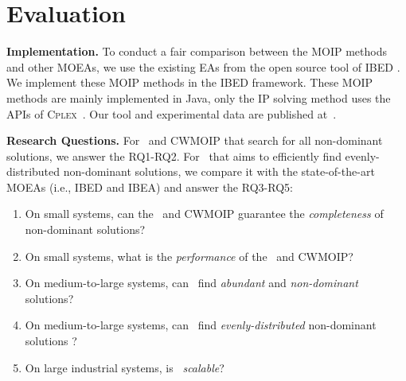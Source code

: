 
\section{Evaluation}\label{sec:application}
\noindent\textbf{Implementation.} To conduct a fair comparison between the MOIP methods and other MOEAs, we use the existing EAs from the open source tool of IBED \cite{DBLP:journals/asc/XueZT0CC016}. We implement these MOIP methods in the \textsc{IBED} framework. These MOIP methods are mainly implemented in Java, only the IP solving method uses the APIs of \textsc{Cplex}~\cite{CPLEX}. Our tool and experimental data are published at~\cite{ourtool}.%

\noindent\textbf{Research Questions.} For \naiveSol~and CWMOIP that search for all non-dominant solutions, we answer the RQ1-RQ2.
For \ourSol~that aims to efficiently find evenly-distributed non-dominant solutions, we compare it with the state-of-the-art MOEAs (i.e., IBED and IBEA) and answer the RQ3-RQ5:
\vspace{-1mm}
\begin{enumerate}[label=\textbf{RQ\arabic*.},itemindent=*,itemsep=0.1mm]
\item On small systems, can  the \naiveSol~and CWMOIP guarantee the \emph{completeness} of non-dominant solutions?
\item On small systems, what is the \emph{performance} of the \naiveSol~and CWMOIP?

\item On medium-to-large systems, can \ourSol~find \emph{abundant} and \emph{non-dominant} solutions?

\item On medium-to-large systems, can \ourSol~find \emph{evenly-distributed} non-dominant solutions ?

\item On large industrial systems, is  \ourSol~\emph{scalable}?

\end{enumerate}
